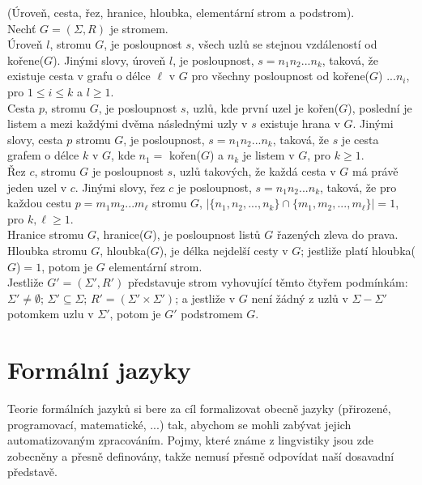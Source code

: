 \begin{defn}
  (Úroveň, cesta, řez, hranice, hloubka, elementární strom a podstrom). \cite[str. 12]{Koutny}\\
  Nechť $G = (\Sigma, R)$ je stromem.\\
  \indent
  Úroveň $l$, stromu $G$, je posloupnost $s$,
  všech uzlů se stejnou vzdáleností od kořene($G$).
  Jinými slovy, úroveň $l$, je posloupnost, $s = n_1 n_2 ... n_k$,
  taková, že existuje cesta v grafu o délce $\ell$ v $G$
  pro všechny posloupnost od kořene($G$)
  $ ... n_i$, pro $1 \leq i \leq k$ a $l \geq 1$.\\
  \indent
  Cesta $p$, stromu $G$, je posloupnost $s$, uzlů,
  kde první uzel je kořen($G$), poslední je listem a mezi každými
  dvěma následnými uzly v $s$ existuje hrana v $G$.
  Jinými slovy, cesta $p$ stromu $G$, je posloupnost,
  $s = n_1 n_2 ... n_k$, taková, že $s$ je cesta grafem
  o délce $k$ v $G$, kde $n_1 =$ kořen($G$) a $n_k$ je listem
  v $G$, pro $k \geq 1$.\\
  \indent
  Řez $c$, stromu $G$ je posloupnost $s$, uzlů takových,
  že každá cesta v $G$ má právě jeden uzel v $c$.
  Jinými slovy, řez $c$ je posloupnost, $s = n_1 n_2 ... n_k$,
  taková, že pro každou cestu $p = m_1 m_2 ... m_\ell$ stromu $G$,
  $|\{n_1, n_2, ..., n_k\} \cap \{m_1, m_2, ..., m_\ell\}| = 1$,
  pro $k, \ell \geq 1$.\\
  \indent
  Hranice stromu $G$, hranice($G$),
  je posloupnost listů $G$ řazených zleva do prava.\\
  \indent
  Hloubka stromu $G$, hloubka($G$), je délka nejdelší cesty v $G$;
  jestliže platí hloubka($G$)$ = 1$, potom je $G$ elementární strom.\\
  \indent
  Jestliže $G' = (\Sigma', R')$ představuje strom vyhovující těmto
  čtyřem podmínkám:
  $\Sigma' \neq \emptyset$;
  $\Sigma' \subseteq \Sigma$;
  $R' = (\Sigma' \times \Sigma')$;
  a jestliže v $G$ není žádný z uzlů v $\Sigma - \Sigma'$ potomkem
  uzlu v $\Sigma'$, potom je $G'$ podstromem $G$.
\end{defn}

\chapter{Formální jazyky}

Teorie formálních jazyků si bere za cíl formalizovat obecně jazyky
(přirozené, programovací, matematické, ...) tak, abychom se mohli zabývat jejich
automatizovaným zpracováním.
Pojmy, které známe z lingvistiky jsou zde zobecněny a přesně definovány,
takže nemusí přesně odpovídat naší dosavadní představě.

